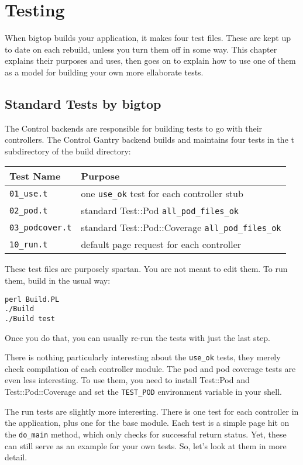 \chapter{Testing}
\label{chap:testing}

When bigtop builds your application, it makes four test files.  These are
kept up to date on each rebuild, unless you turn them off in some way.  This
chapter explains their purposes and uses, then goes on to explain how to
use one of them as a model for building your own more ellaborate tests.

\section{Standard Tests by bigtop}

The Control backends are responsible for building tests to go with their
controllers.  The Control Gantry backend builds and maintains four tests
in the t subdirectory of the build directory:

\begin{tabular}{l|l}
Test Name & Purpose \\
\hline
\verb+01_use.t+      & one \verb+use_ok+ test for each controller stub      \\
\verb+02_pod.t+      & standard Test::Pod \verb+all_pod_files_ok+           \\
\verb+03_podcover.t+ & standard Test::Pod::Coverage \verb+all_pod_files_ok+ \\
\verb+10_run.t+      & default page request for each controller             \\
\end{tabular}

These test files are purposely spartan.  You are not meant to edit them.
To run them, build in the usual way:

\begin{verbatim}
perl Build.PL
./Build
./Build test
\end{verbatim}

Once you do that, you can usually re-run the tests with just the last step.

There is nothing particularly interesting about the \verb+use_ok+ tests,
they merely check compilation of each controller module.  The pod and
pod coverage tests are even less interesting.  To use them, you need to
install Test::Pod and Test::Pod::Coverage and set the \verb+TEST_POD+
environment variable in your shell.

The run tests are slightly more interesting.  There is one test for
each controller in the application, plus one for the base module.  Each
test is a simple page hit on the \verb+do_main+ method, which only checks
for successful return status.  Yet, these can still serve as an example
for your own tests.  So, let's look at them in more detail.

